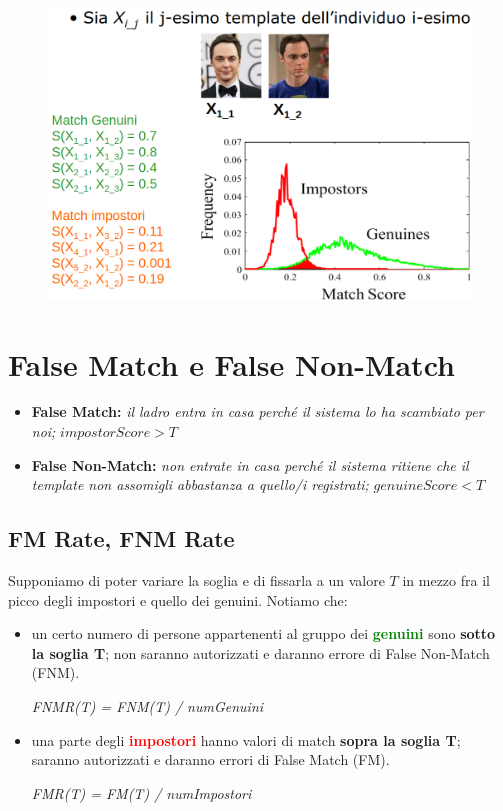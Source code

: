 \begin{figure}[ht]
    \centering
    \includegraphics[width=1\linewidth]{chapters/images-chap2/distr-matchscore.png}
\end{figure}

\section{False Match e False Non-Match}

\begin{itemize}
    \item \textbf{False Match:} \textit{il ladro entra in casa perché il sistema lo 
    ha scambiato per noi;} \textbf{$impostorScore > T$}
    \item \textbf{False Non-Match:} \textit{non entrate in casa perché il sistema ritiene che il template non assomigli
    abbastanza a quello/i registrati;} \textbf{$genuineScore < T$}
\end{itemize}

\subsection{FM Rate, FNM Rate}

Supponiamo di poter variare la soglia e di fissarla a un valore $T$ in mezzo fra il picco
degli impostori e quello dei genuini. Notiamo che:
\begin{itemize}
    \item un certo numero di persone appartenenti al gruppo dei \textbf{\textcolor{green}{genuini}} 
    sono \textbf{sotto la soglia T}; non saranno autorizzati e daranno errore di
    False Non-Match (FNM).

    \textit{FNMR(T) = FNM(T) / numGenuini}
    \item una parte degli \textbf{\textcolor{red}{impostori}} hanno valori di match
    \textbf{sopra la soglia T}; saranno autorizzati e daranno errori di False Match (FM).

    \textit{FMR(T) = FM(T) / numImpostori}
\end{itemize}

